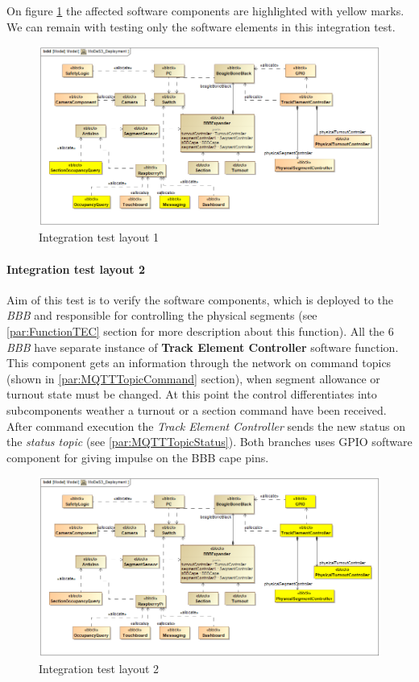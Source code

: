 On figure \ref{fig:MoDeS3_Deployment-test1} the affected software components are highlighted with yellow marks. We can remain with testing only the software elements in this integration test.
\begin{figure}[!h]
	\centering
	\includegraphics[width=150mm, keepaspectratio]{figures/testDesign/testLayoutSYSML/MoDeS3_Deployment-test1.png}
	\caption{Integration test layout 1}
	\label{fig:MoDeS3_Deployment-test1}
\end{figure}

\paragraph{Integration test layout 2}
Aim of this test is to verify the software components, which is deployed to the \textit{BBB} and responsible for controlling the physical segments (see \ref{par:FunctionTEC} section for more description about this function). All the 6 \textit{BBB} have separate instance of \textbf{Track Element Controller} software function. This component gets an information through the network on command topics (shown in \ref{par:MQTTTopicCommand} section), when segment allowance or turnout state must be changed. At this point the control differentiates into subcomponents weather a turnout or a section command have been received. After command execution the \textit{Track Element Controller} sends the new status on the \textit{status topic} (see \ref{par:MQTTTopicStatus}). Both branches uses GPIO software component for giving impulse on the BBB cape pins.
\begin{figure}[!h]
	\centering
	\includegraphics[width=150mm, keepaspectratio]{figures/testDesign/testLayoutSYSML/MoDeS3_Deployment-test2.png}
	\caption{Integration test layout 2}
	\label{fig:MoDeS3_Deployment-test2}
\end{figure}

